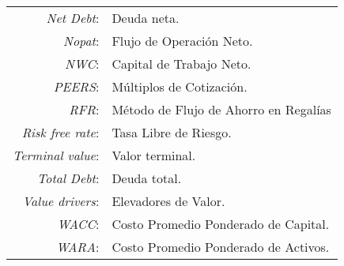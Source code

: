 \begin{table}[H]
\begin{tabular}{rp{10cm}}
\textit{Net Debt}:& 	Deuda neta.\\
\textit{Nopat}:& 	Flujo de Operaci\'on Neto.\\
\textit{NWC}:&	Capital de Trabajo Neto.\\
\textit{PEERS}:&	M\'ultiplos de Cotizaci\'on.\\
\textit{RFR}:& M\'etodo de Flujo de Ahorro en Regal\'ias\\
\textit{Risk free rate}:&	  Tasa Libre de Riesgo.\\
\textit{Terminal value}:&	Valor terminal.\\
\textit{Total Debt}:&	Deuda total.\\
\textit{Value drivers}:&  	Elevadores de Valor.\\
\textit{WACC}:& 		Costo Promedio Ponderado de Capital.\\
\textit{WARA}:&	 Costo Promedio Ponderado de Activos.\\


	\end{tabular}
\end{table}